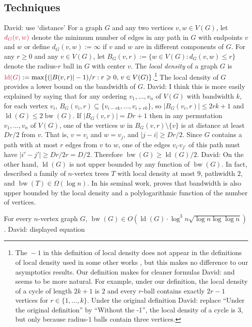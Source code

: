 \documentclass{patmorin}
\makeatletter
\renewcommand{\ge}{\geqslant}
\renewcommand{\le}{\leqslant}
\renewcommand{\leq}{\leqslant}
\newcommand{\david}[1]{{\color{orange} David: #1}}
\newcommand{\defin}[1]{\emph{\textcolor{brightmaroon}{#1}}}
\def\mathcolor#1#{\@mathcolor{#1}}
\def\@mathcolor#1#2#3{%
  \protect\leavevmode
  \begingroup
    \color#1{#2}#3%
  \endgroup
}
\newcommand{\mathdefin}[1]{\mathcolor{brightmaroon}{#1}}
\DeclareMathOperator{\bw}{bw}
\DeclareMathOperator{\ld}{ld}
\makeatother
\begin{document}
\subsection{Techniques}

\david{use `distance'}
For a graph $G$ and any two vertices $v,w\in V(G)$, let $\mathdefin{d_G(v,w)}$ denote the minimum number of edges in any path in $G$ with endpoints $v$ and $w$ or define $d_G(v,w):=\infty$ if $v$ and $w$ are in different components of $G$.  For any $r\ge 0$ and any $v\in V(G)$, let $B_G(v,r):=\{w\in V(G):d_G(v,w)\le r\}$ denote the radius-$r$ ball in $G$ with center $v$.
The \defin{local density} of a graph $G$ is $\mathdefin{\ld(G)}:=\max\{(|B(v,r)|-1)/r:r\ge 0,\, v\in V(G)\}$.\footnote{The ${}-1$ in this definition of local density does not appear in the definitions of local density used in some other works \cite{feige:approximating,rao:small}, but this makes no difference to our asymptotics results.  Our definition makes for cleaner formulas \david{and} seems to be more natural. For example, under our definition, the local density of a cycle of length $2k+1$ is $2$ and every $r$-ball contains exactly $2r-1$ vertices for $r\in\{1,\ldots,k\}$. Under the original definition\david{replace ``Under the original definition'' by ``Without the -1''}, the local density of a cycle is $3$, but only because radius-$1$ balls contain three vertices.} The local density of $G$ provides a lower bound on the bandwidth of $G$. \david{I think this is more easily explained by saying that for any ordering $v_1,\dots,v_n$ of $V(G)$ with bandwidth $k$, for each vertex $v_i$,
$B_G(v_i,r) \subseteq \{v_{i-rk},\dots,v_{i+rk}\}$, so $|B_G(v_i,r)|\leq 2rk+1$ and $\ld(G)\leq 2\bw(G)$.} If $|B_G(v,r)|=Dr+1$ then in any permutation $v_1,\ldots,v_n$ of $V(G)$, one of the vertices $w$ in $B_G(v,r)\setminus \{v\}$ is at distance at least $Dr/2$ from $v$. That is, $v=v_i$ and $w=v_j$, and $|j-i|\ge Dr/2$.  Since $G$ contains a path with at most $r$ edges from $v$ to $w$, one of the edges $v_{i'}v_{j'}$ of this path must have $|i'-j'|\ge Dr/2r=D/2$.  Therefore $\bw(G)\ge\ld(G)/2$.
\david{On the other hand, $\ld(G)$ is not upper bounded by any function of $\bw(G)$. In fact, \citet{CS89} described a family of $n$-vertex trees $T$ with local density at most $9$, pathwidth $2$, and  $\bw(T)\in\Omega(\log n)$.}
In his seminal work, \citet{feige:approximating} proves that bandwidth is also upper bounded by the local density and a polylogarithmic function of the number of vertices.

\begin{thm}\label{feige_bandwidth_vs_density}
  For every $n$-vertex graph $G$, $\bw(G)\in O\left(\ld(G)\cdot \log^3 n\sqrt{\log n\log\log n}\right)$. \david{displayed equation}
\end{thm}
\end{document}

